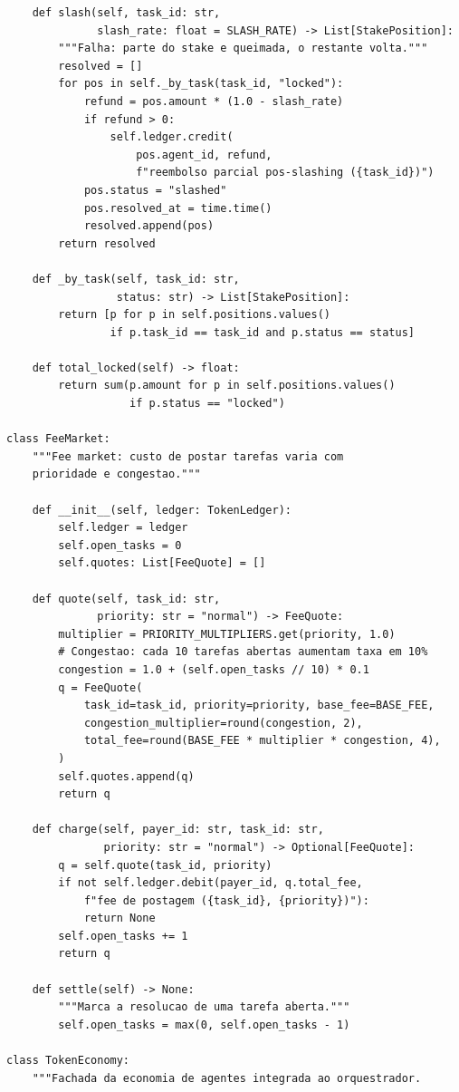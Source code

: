 \begin{verbatim}
    def slash(self, task_id: str,
              slash_rate: float = SLASH_RATE) -> List[StakePosition]:
        """Falha: parte do stake e queimada, o restante volta."""
        resolved = []
        for pos in self._by_task(task_id, "locked"):
            refund = pos.amount * (1.0 - slash_rate)
            if refund > 0:
                self.ledger.credit(
                    pos.agent_id, refund,
                    f"reembolso parcial pos-slashing ({task_id})")
            pos.status = "slashed"
            pos.resolved_at = time.time()
            resolved.append(pos)
        return resolved

    def _by_task(self, task_id: str,
                 status: str) -> List[StakePosition]:
        return [p for p in self.positions.values()
                if p.task_id == task_id and p.status == status]

    def total_locked(self) -> float:
        return sum(p.amount for p in self.positions.values()
                   if p.status == "locked")

class FeeMarket:
    """Fee market: custo de postar tarefas varia com
    prioridade e congestao."""

    def __init__(self, ledger: TokenLedger):
        self.ledger = ledger
        self.open_tasks = 0
        self.quotes: List[FeeQuote] = []

    def quote(self, task_id: str,
              priority: str = "normal") -> FeeQuote:
        multiplier = PRIORITY_MULTIPLIERS.get(priority, 1.0)
        # Congestao: cada 10 tarefas abertas aumentam taxa em 10%
        congestion = 1.0 + (self.open_tasks // 10) * 0.1
        q = FeeQuote(
            task_id=task_id, priority=priority, base_fee=BASE_FEE,
            congestion_multiplier=round(congestion, 2),
            total_fee=round(BASE_FEE * multiplier * congestion, 4),
        )
        self.quotes.append(q)
        return q

    def charge(self, payer_id: str, task_id: str,
               priority: str = "normal") -> Optional[FeeQuote]:
        q = self.quote(task_id, priority)
        if not self.ledger.debit(payer_id, q.total_fee,
            f"fee de postagem ({task_id}, {priority})"):
            return None
        self.open_tasks += 1
        return q

    def settle(self) -> None:
        """Marca a resolucao de uma tarefa aberta."""
        self.open_tasks = max(0, self.open_tasks - 1)

class TokenEconomy:
    """Fachada da economia de agentes integrada ao orquestrador.


\end{verbatim}
